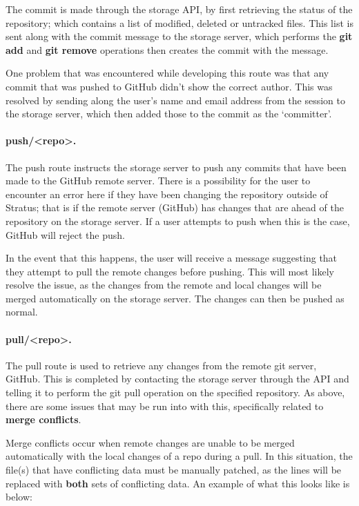 	The commit is made through the storage API, by first retrieving the status of the repository; which contains a list of modified, deleted or untracked files. This list is sent along with the commit message to the storage server, which performs the \textbf{git add} and \textbf{git remove} operations then creates the commit with the message.

	One problem that was encountered while developing this route was that any commit that was pushed to GitHub didn't show the correct author. This was resolved by sending along the user's name and email address from the session to the storage server, which then added those to the commit as the `committer'.

	\paragraph{push/<repo>.}
	The push route instructs the storage server to push any commits that have been made to the GitHub remote server. There is a possibility for the user to encounter an error here if they have been changing the repository outside of Stratus; that is if the remote server (GitHub) has changes that are ahead of the repository on the storage server. If a user attempts to push when this is the case, GitHub will reject the push.

	In the event that this happens, the user will receive a message suggesting that they attempt to pull the remote changes before pushing. This will most likely resolve the issue, as the changes from the remote and local changes will be merged automatically on the storage server. The changes can then be pushed as normal.

	\paragraph{pull/<repo>.}
	The pull route is used to retrieve any changes from the remote git server, GitHub. This is completed by contacting the storage server through the API and telling it to perform the git pull operation on the specified repository. As above, there are some issues that may be run into with this, specifically related to \textbf{merge conflicts}.

	Merge conflicts occur when remote changes are unable to be merged automatically with the local changes of a repo during a pull. In this situation, the file(s) that have conflicting data must be manually patched, as the lines will be replaced with \textbf{both} sets of conflicting data. An example of what this looks like is below:

